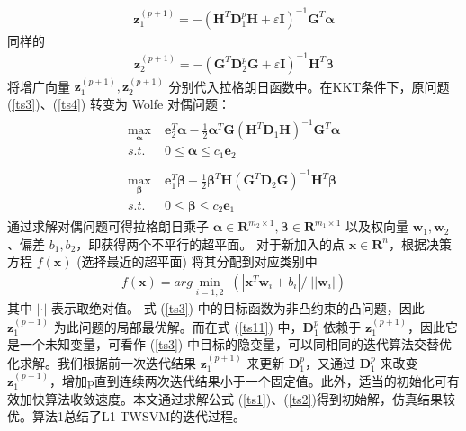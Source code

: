 \begin{align}
	\mathbf{z}_1^{(p+1)}=-(\mathbf{H}^T\mathbf{D}_1^p\mathbf{H}+\varepsilon \mathbf{I})^{-1}\mathbf{G}^T\pmb{\alpha}
\end{align}
同样的
\begin{align}
	\mathbf{z}_2^{(p+1)}=-(\mathbf{G}^T\mathbf{D}_2^p\mathbf{G}+\varepsilon \mathbf{I})^{-1}\mathbf{H}^T\pmb{\beta}
\end{align}
将增广向量 $\mathbf{z}_1^{(p+1)},\mathbf{z}_2^{(p+1)}$ 分别代入拉格朗日函数中。在KKT条件下，原问题 (\ref{ts3})、(\ref{ts4}) 转变为 Wolfe 对偶问题：
\begin{align}
\begin{split}
	\max \limits_{\pmb{\alpha}} \;& \mathbf{e}_2^T\pmb{\alpha}-\frac{1}{2}\pmb{\alpha}^T\mathbf{G}(\mathbf{H}^T\mathbf{D}_1\mathbf{H})^{-1}\mathbf{G}^T\pmb{\alpha} \\
	s.t.\;& 0\le \pmb{\alpha} \le c_1\mathbf{e}_2
\end{split}
\\
\begin{split}		
	\max \limits_{\pmb{\beta}} \;& \mathbf{e}_1^T\pmb{\beta}-\frac{1}{2}\pmb{\beta}^T\mathbf{H}(\mathbf{G}^T\mathbf{D}_2\mathbf{G})^{-1}\mathbf{H}^T\pmb{\beta} \\
	s.t.\;& 0\le \pmb{\beta} \le c_2\mathbf{e}_1
\end{split}
\end{align}
通过求解对偶问题可得拉格朗日乘子 $\pmb{\alpha} \in \pmb{R}^{m_2\times 1},\pmb{\beta} \in \pmb{R}^{m_1\times 1}$ 以及权向量 $\mathbf{w}_1,\mathbf{w}_2$、偏差 $b_1,b_2$，即获得两个不平行的超平面。
对于新加入的点 $\mathbf{x}\in \mathbf{R}^n$，根据决策方程 $f(\mathbf{x})$ (选择最近的超平面) 将其分配到对应类别中
\begin{align}
	f(\mathbf{x})=arg \min\limits_{i=1,2} \;(|\mathbf{x}^T\mathbf{w}_i+b_i|/|||\mathbf{w}_i|)
\end{align}
其中 $|\cdot|$ 表示取绝对值。
式 (\ref{ts3}) 中的目标函数为非凸约束的凸问题，因此 $\mathbf{z}_1^{(p+1)}$ 为此问题的局部最优解。而在式 (\ref{ts11}) 中，$\mathbf{D}_1^p$ 依赖于 $\mathbf{z}_1^{(p+1)}$，因此它是一个未知变量，可看作 (\ref{ts3}) 中目标的隐变量，可以同相同的迭代算法交替优化求解。我们根据前一次迭代结果 $\mathbf{z}_1^{(p+1)}$ 来更新 $\mathbf{D}_1^p$，又通过 $\mathbf{D}_1^p$ 来改变 $\mathbf{z}_1^{(p+1)}$，增加p直到连续两次迭代结果小于一个固定值。此外，适当的初始化可有效加快算法收敛速度。本文通过求解公式 (\ref{ts1})、(\ref{ts2})得到初始解，仿真结果较优。算法1总结了L1-TWSVM的迭代过程。